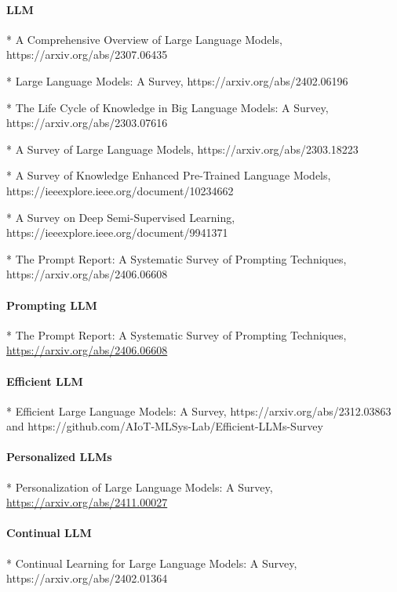 \paragraph{LLM}

* A Comprehensive Overview of Large Language Models, https://arxiv.org/abs/2307.06435

* Large Language Models: A Survey, https://arxiv.org/abs/2402.06196

* The Life Cycle of Knowledge in Big Language Models: A Survey, https://arxiv.org/abs/2303.07616

* A Survey of Large Language Models, https://arxiv.org/abs/2303.18223

* A Survey of Knowledge Enhanced Pre-Trained Language Models, https://ieeexplore.ieee.org/document/10234662

* A Survey on Deep Semi-Supervised Learning, https://ieeexplore.ieee.org/document/9941371

* The Prompt Report: A Systematic Survey of Prompting Techniques, https://arxiv.org/abs/2406.06608

\paragraph{Prompting LLM}

* The Prompt Report: A Systematic Survey of Prompting Techniques, \url{https://arxiv.org/abs/2406.06608}

\paragraph{Efficient LLM}

* Efficient Large Language Models: A Survey, https://arxiv.org/abs/2312.03863 and https://github.com/AIoT-MLSys-Lab/Efficient-LLMs-Survey

\paragraph{Personalized LLMs}

* Personalization of Large Language Models: A Survey, \url{https://arxiv.org/abs/2411.00027}

\paragraph{Continual LLM}

* Continual Learning for Large Language Models: A Survey, https://arxiv.org/abs/2402.01364

